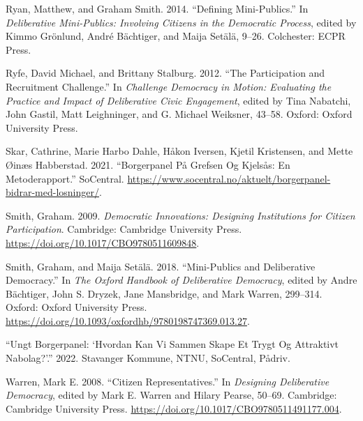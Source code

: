 \documentclass[
  12pt,
  a4paper, 12pt]{article}
\newlength{\cslhangindent}
\newlength{\cslentryspacingunit} %
\newenvironment{CSLReferences}[2] %
 {%
  \setlength{\parindent}{0pt}
  \ifodd #1
  \let\oldpar\par
  \def\par{\hangindent=\cslhangindent\oldpar}
  \fi
  \setlength{\parskip}{#2\cslentryspacingunit}
 }%
 {}
\begin{document}
\begin{CSLReferences}{1}{0}
\leavevmode{}%
Ryan, Matthew, and Graham Smith. 2014. {``Defining {Mini}-{Publics}.''} In \emph{Deliberative {Mini}-{Publics}: {Involving} {Citizens} in the {Democratic} {Process}}, edited by Kimmo Grönlund, André Bächtiger, and Maija Setälä, 9--26. Colchester: ECPR Press.

\leavevmode{}%
Ryfe, David Michael, and Brittany Stalburg. 2012. {``The {Participation} and {Recruitment} {Challenge}.''} In \emph{Challenge {Democracy} in {Motion}: {Evaluating} the {Practice} and {Impact} of {Deliberative} {Civic} {Engagement}}, edited by Tina Nabatchi, John Gastil, Matt Leighninger, and G. Michael Weiksner, 43--58. Oxford: Oxford University Press.

\leavevmode{}%
Skar, Cathrine, Marie Harbo Dahle, Håkon Iversen, Kjetil Kristensen, and Mette Øinæs Habberstad. 2021. {``Borgerpanel På {Grefsen} Og {Kjelsås}: {En} Metoderapport.''} SoCentral. \url{https://www.socentral.no/aktuelt/borgerpanel-bidrar-med-losninger/}.

\leavevmode{}%
Smith, Graham. 2009. \emph{Democratic Innovations: {Designing} Institutions for Citizen Participation}. Cambridge: Cambridge University Press. \url{https://doi.org/10.1017/CBO9780511609848}.

\leavevmode{}%
Smith, Graham, and Maija Setälä. 2018. {``Mini-{Publics} and {Deliberative} {Democracy}.''} In \emph{The {Oxford} {Handbook} of {Deliberative} {Democracy}}, edited by Andre Bächtiger, John S. Dryzek, Jane Mansbridge, and Mark Warren, 299--314. Oxford: Oxford University Press. \url{https://doi.org/10.1093/oxfordhb/9780198747369.013.27}.

\leavevmode{}%
{``Ungt {Borgerpanel}: {`{Hvordan} Kan Vi Sammen Skape Et Trygt Og Attraktivt Nabolag?'}.''} 2022. Stavanger Kommune, NTNU, SoCentral, Pådriv.

\leavevmode{}%
Warren, Mark E. 2008. {``Citizen Representatives.''} In \emph{Designing {Deliberative} {Democracy}}, edited by Mark E. Warren and Hilary Pearse, 50--69. Cambridge: Cambridge University Press. \url{https://doi.org/10.1017/CBO9780511491177.004}.

\end{CSLReferences}
\end{document}
